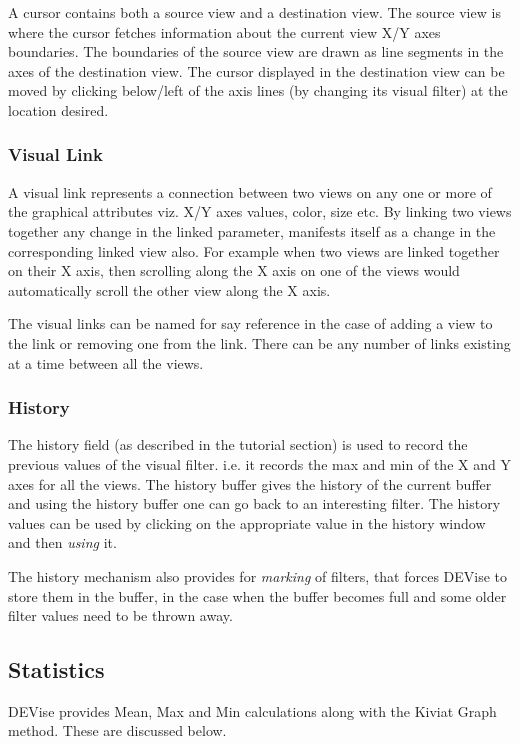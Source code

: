 A cursor contains both a source view and a destination view. The
source view is where the cursor fetches information about the current
view X/Y axes boundaries. The boundaries of the source view are drawn
as line segments in the axes of the destination view. The cursor
displayed in the destination view can be moved by clicking below/left
of the axis lines (by changing its visual filter) at the location
desired.

\subsubsection{Visual Link}

A visual link represents a connection between two views on any one or
more of the graphical attributes viz. X/Y axes values, color, size
etc. By linking two views together any change in the linked
parameter, manifests itself as a change in the corresponding linked
view also. For example when two views are linked together on their X
axis, then scrolling along the X axis on one of the views would
automatically scroll the other view along the X axis.

The visual links can be named for say reference in the case of adding
a view to the link or removing one from the link. There can be any
number of links existing at a time between all the views.

\subsubsection{History}

The history field (as described in the tutorial section) is used to
record the previous values of the visual filter. i.e. it records the
max and min of the X and Y axes for all the views. The history buffer
gives the history of the current buffer and using the history buffer
one can go back to an interesting filter. The history values can be
used by clicking on the appropriate value in the history window and
then {\em using} it.

The history mechanism also provides for {\em marking} of filters,
that forces DEVise to store them in the buffer, in the case when the
buffer becomes full and some older filter values need to be thrown
away.

\subsection{Statistics}

DEVise provides Mean, Max and Min calculations along with the Kiviat
Graph method. These are discussed below.

